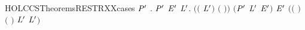 \begin{SaveVerbatim}{HOLCCSTheoremsRESTRXXcases}
\HOLTokenTurnstile{} \HOLSymConst{\HOLTokenForall{}}\ensuremath{\HOLBoundVar{P}\sp{\prime}}   .
          \HOLTokenTransBegin{}\HOLTokenTransEnd \ensuremath{\HOLBoundVar{P}\sp{\prime}} \HOLSymConst{\HOLTokenImp{}}
       \HOLSymConst{\HOLTokenExists{}} \ensuremath{\HOLBoundVar{E}\sp{\prime}}  \ensuremath{\HOLBoundVar{L}\sp{\prime}}.
           \ensuremath{(}\ensuremath{(} \HOLSymConst{\ensuremath{=}} \ensuremath{\HOLBoundVar{L}\sp{\prime}}\ensuremath{)} \HOLSymConst{\HOLTokenConj{}} \ensuremath{(} \HOLSymConst{\ensuremath{=}} \ensuremath{)}\ensuremath{)} \HOLSymConst{\HOLTokenConj{}} \ensuremath{(}\ensuremath{\HOLBoundVar{P}\sp{\prime}} \HOLSymConst{\ensuremath{=}}  \ensuremath{\HOLBoundVar{L}\sp{\prime}} \ensuremath{\HOLBoundVar{E}\sp{\prime}}\ensuremath{)} \HOLSymConst{\HOLTokenConj{}}  \HOLTokenTransBegin{}\HOLTokenTransEnd \ensuremath{\HOLBoundVar{E}\sp{\prime}} \HOLSymConst{\HOLTokenConj{}}
           \ensuremath{(}\ensuremath{(} \HOLSymConst{\ensuremath{=}} \HOLConst{\ensuremath{\tau}}\ensuremath{)} \HOLSymConst{\HOLTokenDisj{}} \ensuremath{(} \HOLSymConst{\ensuremath{=}}  \ensuremath{)} \HOLSymConst{\HOLTokenConj{}}  \HOLConst{\HOLTokenNotIn{}} \ensuremath{\HOLBoundVar{L}\sp{\prime}} \HOLSymConst{\HOLTokenConj{}}   \HOLConst{\HOLTokenNotIn{}} \ensuremath{\HOLBoundVar{L}\sp{\prime}}\ensuremath{)}
\end{SaveVerbatim}
\newcommand{\HOLCCSTheoremsRESTRXXcases}{\UseVerbatim{HOLCCSTheoremsRESTRXXcases}}
